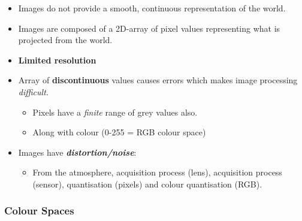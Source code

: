 \documentclass[english, 10pt]{article}
\begin{document}
\begin{itemize}
\item
  Images do not provide a smooth, continuous representation of the
  world.
\item
  Images are composed of a 2D-array of pixel values representing what is
  projected from the world.
\item
  \textbf{Limited resolution}
\item
  Array of \textbf{discontinuous} values causes errors which makes image
  processing \emph{difficult.}

  \begin{itemize}
  \item
    Pixels have a \emph{finite} range of grey values also.
  \item
    Along with colour (0-255 = RGB colour space)
  \end{itemize}
\item
  Images have \textbf{\emph{distortion/noise}}:

  \begin{itemize}
  \itemsep1pt\parskip0pt
  \item
    From the atmosphere, acquisition process (lens), acquisition process
    (sensor), quantisation (pixels) and colour quantisation (RGB).
  \end{itemize}
\end{itemize}

\subsubsection{Colour Spaces}\label{colour-spaces}
\end{document}
